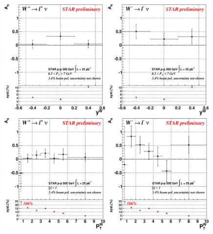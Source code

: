 \documentclass{PoS}
\begin{document}
\begin{figure}[htbp]
  \centering
  \includegraphics[width=0.49\textwidth]{hd_Wp_AsymAmpSqrtVsRap.eps}
  \includegraphics[width=0.49\textwidth]{hd_Wm_AsymAmpSqrtVsRap.eps}
  \includegraphics[width=0.49\textwidth]{hd_Wp_AsymAmpSqrtVsPt.eps}
  \includegraphics[width=0.49\textwidth]{hd_Wm_AsymAmpSqrtVsPt.eps}

\end{figure}
\end{document}
